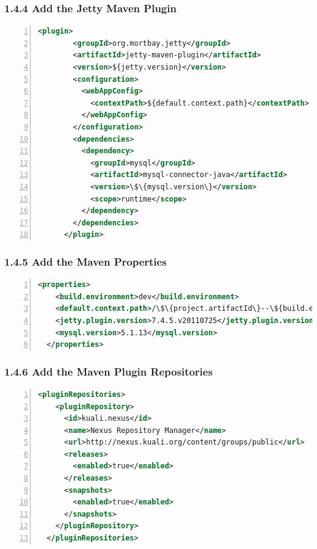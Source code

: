 \subsubsection*{1.4.4 Add the Jetty Maven Plugin}
\begin{lstlisting}[numbers=left,language=xml,basicstyle=\scriptsize,backgroundcolor=\color{ubergray},caption={training/pom.xml},frame=single,breaklines=true]
      <plugin>
        <groupId>org.mortbay.jetty</groupId>
        <artifactId>jetty-maven-plugin</artifactId>
        <version>${jetty.version}</version>
        <configuration>
          <webAppConfig>
            <contextPath>${default.context.path}</contextPath>
          </webAppConfig>
        </configuration>
        <dependencies>
          <dependency>
            <groupId>mysql</groupId>
            <artifactId>mysql-connector-java</artifactId>
            <version>\$\{mysql.version\}</version>
            <scope>runtime</scope>
          </dependency>
        </dependencies>
      </plugin>					
\end{lstlisting}

\subsubsection*{1.4.5 Add the Maven Properties}
\begin{lstlisting}[numbers=left,language=xml,basicstyle=\scriptsize,backgroundcolor=\color{ubergray},caption={training/pom.xml},frame=single,breaklines=true
]
  <properties>
    <build.environment>dev</build.environment>
    <default.context.path>/\$\{project.artifactId\}--\${build.environment\}</default.context.path>
    <jetty.plugin.version>7.4.5.v20110725</jetty.plugin.version>
    <mysql.version>5.1.13</mysql.version>
  </properties>
\end{lstlisting}

\subsubsection*{1.4.6 Add the Maven Plugin Repositories}
\begin{lstlisting}[numbers=left,language=xml,basicstyle=\scriptsize,backgroundcolor=\color{ubergray},caption={training/pom.xml},frame=single,breaklines=true
]
  <pluginRepositories>
    <pluginRepository> 
      <id>kuali.nexus</id> 
      <name>Nexus Repository Manager</name> 
      <url>http://nexus.kuali.org/content/groups/public</url> 
      <releases> 
        <enabled>true</enabled> 
      </releases> 
      <snapshots> 
        <enabled>true</enabled> 
      </snapshots> 
    </pluginRepository>
  </pluginRepositories> 
\end{lstlisting}

